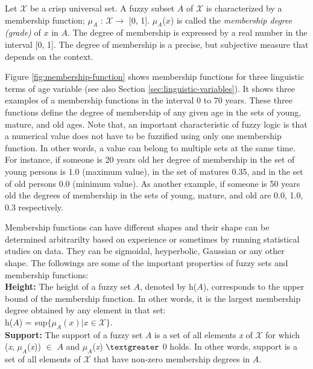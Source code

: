 \documentclass[11pt]{article}
\begin{document}
Let $\mathcal{X}$ be a crisp universal set. A fuzzy subset $\textit{A}$ of
$\mathcal{X}$ is characterized by a membership function; $\mu_A$ : $\mathcal{X}
\rightarrow$ [0, 1]. $\mu_A$($\textit{x}$) is called the \textit{membership
degree (grade)} of $\textit{x}$ in $\textit{A}$. The degree of membership is
expressed by a real number in the interval [0, 1]. The degree of membership is a
precise, but subjective measure that depends on the context.

Figure \ref{fig:membership-function} shows membership functions for three
linguistic terms of age variable (see also Section
\ref{sec:linguistic-variables}). It shows three examples of a membership
functions in the interval 0 to 70 years. These three functions define the degree
of membership of any given age in the sets of young, mature, and old ages. Note
that, an important characteristic of fuzzy logic is that a numerical value does
not have to be fuzzified using only one membership function. In other words, a
value can belong to multiple sets at the same time. For instance, if someone is
20 years old her degree of membership in the set of young persons is 1.0
(maximum value), in the set of matures 0.35, and in the set of old persons 0.0
(minimum value). As another example, if someone is 50 years old the degrees of
membership in the sets of young, mature, and old are 0.0, 1.0, 0.3 respectively.

Membership functions can have different shapes and their shape can be determined
arbitrarilty based on experience or sometimes by running statistical studies on
data. They can be sigmoidal, heyperbolic, Gaussian or any other shape. The
followings are some of the important properties of fuzzy sets and membership
functions:\\

\textbf{Height:} The height of a fuzzy set $\textit{A}$, denoted by
$\textit{h}$($\textit{A}$), corresponds to the upper bound of the membership
function. In other words, it is the largest membership degree obtained by any
element in that set:\\

$\textit{h}$($\textit{A}$) = sup$\{\mu_A(\textit{x}) | \textit{x} \in
\mathcal{X}\}$.\\

\textbf{Support:} The support of a fuzzy set $\textit{A}$ is a set of all
elements \textit{x} of $\mathcal{X}$ for which (\textit{x}, $\mu_A$(\textit{x}))
$\in$ $\textit{A}$ and $\mu_A$(\textit{x}) $\textgreater$ 0 holds. In other
words, support is a set of all elements of $\mathcal{X}$ that have non-zero
membership degrees in $\textit{A}$.\\
\end{document}
